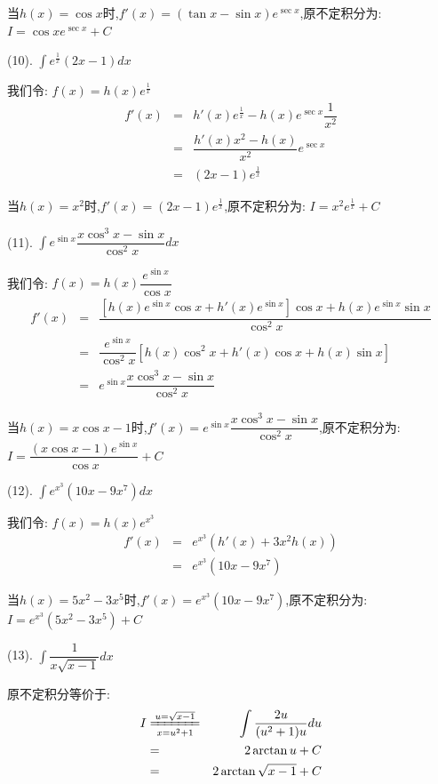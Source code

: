 \begin{anymark}[积分训练]
\begin{solution}
		当$h(x)=\cos x$时,$f'(x)=(\tan x-\sin x)e^{\sec x}$,原不定积分为:  $I=\cos xe^{\sec x}+C$
	\end{solution}
	(10). $\int e^{\frac{1}{x}}(2x-1)dx$
	\begin{solution}
		
		我们令:  $f(x)=h(x)e^{\frac{1}{x}}$
		\begin{eqnarray*}
			f'(x)&=&h'(x)e^{\frac{1}{x}}-h(x)e^{\sec x}\dfrac{1}{x^2}\\
			&=&\dfrac{h'(x)x^2-h(x)}{x^2}e^{\sec x}\\
			&=&(2x-1)e^{\frac{1}{x}}
		\end{eqnarray*}
		
		当$h(x)=x^2$时,$f'(x)=(2x-1)e^{\frac{1}{x}}$,原不定积分为:  $I=x^2e^{\frac{1}{x}}+C$
	\end{solution}
	(11). $\int e^{\sin x}\dfrac{x\cos^3 x-\sin x}{\cos^2x}dx$
	\begin{solution}
		
		我们令:  $f(x)=h(x)\dfrac{e^{\sin x}}{\cos x}$
		\begin{eqnarray*}
			f'(x)&=&\dfrac{\left[h(x)e^{\sin x}\cos x+h'(x)e^{\sin x}\right]\cos x+h(x)e^{\sin x}\sin x }{\cos^2 x}\\
			&=&\dfrac{e^{\sin x}}{\cos^2 x}\left[ h(x)\cos^2 x+h'(x)\cos x+h(x)\sin x\right] \\
			&=&e^{\sin x}\dfrac{x\cos^3 x-\sin x}{\cos^2x}
		\end{eqnarray*}
		
		当$h(x)=x\cos x-1$时,$f'(x)=e^{\sin x}\dfrac{x\cos^3 x-\sin x}{\cos^2x}$,原不定积分为:  $I=\dfrac{(x\cos x-1)e^{\sin x}}{\cos x}+C$
	\end{solution}
	(12). $\int e^{x^3}(10x-9x^7)dx$
	\begin{solution}
		
		我们令:  $f(x)=h(x)e^{x^3}$
		\begin{eqnarray*}
			f'(x)&=&e^{x^3}\left(h'(x)+3x^2h(x)\right) \\
			&=&e^{x^3}(10x-9x^7)
		\end{eqnarray*}
		
		当$h(x)=5x^2-3x^5$时,$f'(x)=e^{x^3}(10x-9x^7)$,原不定积分为:  $I=e^{x^3}(5x^2-3x^5)+C$
	\end{solution}
	(13). $\int \dfrac{1}{x\sqrt{x-1}}dx$
	\begin{solution}
		
		原不定积分等价于:  
		\begin{eqnarray*}
			I&\xlongequal[x=u^2+1]{u=\sqrt{x-1}}&\int \dfrac{2u}{(u^2+1)u}du\\
			&=&2\arctan u+C\\
			&=&2\arctan \sqrt{x-1}+C
		\end{eqnarray*}
	

\end{solution}
\end{anymark}
